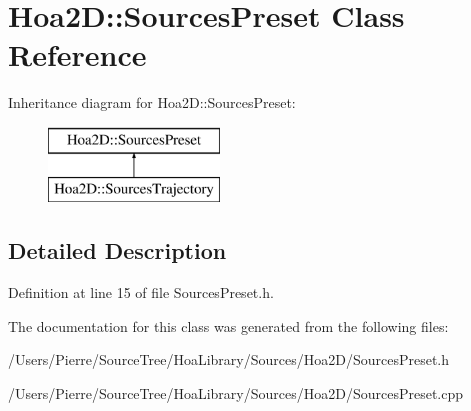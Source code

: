 \hypertarget{class_hoa2_d_1_1_sources_preset}{\section{Hoa2\-D\-:\-:Sources\-Preset Class Reference}
\label{class_hoa2_d_1_1_sources_preset}
}
Inheritance diagram for Hoa2\-D\-:\-:Sources\-Preset\-:\begin{figure}[H]
\begin{center}
\leavevmode
\includegraphics[height=2.000000cm]{class_hoa2_d_1_1_sources_preset}
\end{center}
\end{figure}


\subsection{Detailed Description}


Definition at line 15 of file Sources\-Preset.\-h.



The documentation for this class was generated from the following files\-:\begin{DoxyCompactItemize}
\item 
/\-Users/\-Pierre/\-Source\-Tree/\-Hoa\-Library/\-Sources/\-Hoa2\-D/Sources\-Preset.\-h\item 
/\-Users/\-Pierre/\-Source\-Tree/\-Hoa\-Library/\-Sources/\-Hoa2\-D/Sources\-Preset.\-cpp\end{DoxyCompactItemize}
